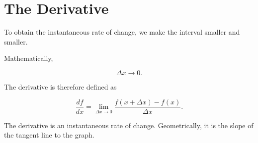 \section{The Derivative}

To obtain the instantaneous rate of change, we make the interval
smaller and smaller.

Mathematically,

\[
\Delta x\rightarrow0.
\]

The derivative is therefore defined as

\[
\boxed{
	\frac{df}{dx}
	=
	\lim_{\Delta x\rightarrow0}
	\frac{f(x+\Delta x)-f(x)}
	{\Delta x}.
}
\]

\begin{keyidea}
The derivative is an instantaneous rate of change. Geometrically, it is the
slope of the tangent line to the graph.
\end{keyidea}

